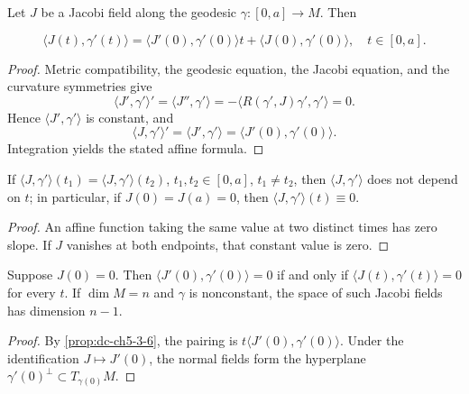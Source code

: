 \begin{proposition}
  \label{prop:dc-ch5-3-6}
  \leanok
  Let $J$ be a Jacobi field along the geodesic $\gamma:[0,a]\to M$. Then

  $$
  \langle J(t),\gamma'(t)\rangle=\langle J'(0),\gamma'(0)\rangle t+\langle J(0),\gamma'(0)\rangle,\quad t\in[0,a].
  $$

\end{proposition}
\begin{proof}
  \leanok
  \sketch
  Metric compatibility, the geodesic equation, the Jacobi equation, and the
  curvature symmetries give
  $$
  \langle J',\gamma'\rangle'=\langle J'',\gamma'\rangle=-\langle R(\gamma',J)\gamma',\gamma'\rangle=0.
  $$
  Hence $\langle J',\gamma'\rangle$ is constant, and
  $$
  \langle J,\gamma'\rangle'=\langle J',\gamma'\rangle=\langle J'(0),\gamma'(0)\rangle.
  $$
  Integration yields the stated affine formula.
\end{proof}

\begin{corollary}
  \label{cor:dc-ch5-3-7}
  \leanok
  If $\langle J,\gamma'\rangle(t_1)=\langle J,\gamma'\rangle(t_2)$, $t_1,t_2\in[0,a]$,
  $t_1\neq t_2$, then $\langle J,\gamma'\rangle$ does not depend on $t$; in
  particular, if $J(0)=J(a)=0$, then $\langle J,\gamma'\rangle(t)\equiv 0$.
\end{corollary}
\begin{proof}

  \sketch
  An affine function taking the same value at two distinct times has zero
  slope. If $J$ vanishes at both endpoints, that constant value is zero.
\end{proof}

\begin{corollary}
  \label{cor:dc-ch5-3-8}
  \leanok
  Suppose $J(0)=0$. Then
  $\langle J'(0),\gamma'(0)\rangle=0$ if and only if
  $\langle J(t),\gamma'(t)\rangle=0$ for every $t$. If $\dim M=n$ and $\gamma$
  is nonconstant, the space of such Jacobi fields has dimension $n-1$.
\end{corollary}
\begin{proof}

  \sketch
  By \cref{prop:dc-ch5-3-6}, the pairing is
  $t\langle J'(0),\gamma'(0)\rangle$. Under the identification
  $J\mapsto J'(0)$, the normal fields form the hyperplane
  $\gamma'(0)^\perp\subset T_{\gamma(0)}M$.
\end{proof}

